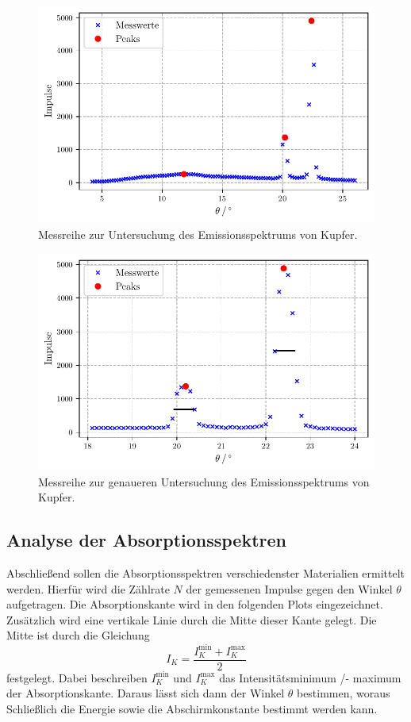 \begin{figure}
  \centering
  \caption{Messreihe zur Untersuchung des Emissionsspektrums von Kupfer.}
  \label{fig:kupfer1}
  \includegraphics[width=0.5 \linewidth]{build/kupfer1.pdf}
\end{figure}

\begin{figure}
  \centering
  \caption{ Messreihe zur genaueren Untersuchung des Emissionsspektrums von Kupfer.}
  \label{fig:kupfer2}
  \includegraphics[width=0.5 \linewidth]{build/kupfer2.pdf}
\end{figure}

\subsection{Analyse der Absorptionsspektren}

Abschließend sollen die Absorptionsspektren verschiedenster Materialien ermittelt werden.
Hierfür wird die Zählrate $N$ der gemessenen Impulse gegen den Winkel $\theta$ aufgetragen.
Die Absorptionskante wird in den folgenden Plots eingezeichnet.
Zusätzlich wird eine vertikale Linie durch die Mitte dieser Kante gelegt.
Die Mitte ist durch die Gleichung
\begin{equation*}
  I_K = \frac{I_K^\text{min} + I_K^\text{max}}{2}
\end{equation*}
festgelegt. Dabei beschreiben $I_K^\text{min}$ und $I_K^\text{max}$ das Intensitätsminimum /- maximum der Absorptionskante.
Daraus lässt sich dann der Winkel $\theta$ bestimmen, woraus Schließlich die Energie sowie die Abschirmkonstante bestimmt werden kann.

